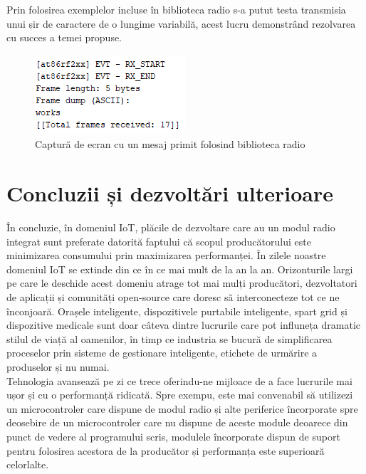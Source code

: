 \documentclass[12pt,a4paper]{report}
\begin{document}
Prin folosirea exemplelor incluse în biblioteca radio s-a putut testa transmisia unui șir de caractere de o lungime variabilă, acest lucru demonstrând rezolvarea cu succes a temei propuse.
\begin{figure}[!htb]
\centering
\includegraphics[scale=0.9]{pics/demoreceive.png}
  \caption{Captură de ecran cu un mesaj primit folosind biblioteca radio}
  \label{fig:demoreceive}
\end{figure}

\chapter{Concluzii și dezvoltări ulterioare}
În concluzie, în domeniul IoT, plăcile de dezvoltare care au un modul radio integrat sunt preferate datorită faptului că scopul producătorului este minimizarea consumului prin maximizarea performanței. În zilele noastre domeniul IoT se extinde din ce în ce mai mult de la an la an. Orizonturile largi pe care le deschide acest domeniu atrage tot mai mulți producători, dezvoltatori de aplicații și comunități open-source care doresc să interconecteze tot ce ne înconjoară. Orașele inteligente, dispozitivele purtabile inteligente, spart grid și dispozitive medicale sunt doar câteva dintre lucrurile care pot influneța dramatic stilul de viață al oamenilor, în timp ce industria se bucură de simplificarea proceselor prin sisteme de gestionare inteligente, etichete de urmărire a produselor și nu numai. \\
Tehnologia avansează pe zi ce trece oferindu-ne mijloace de a face lucrurile mai ușor și cu o performanță ridicată. Spre exempu, este mai convenabil să utilizezi un microcontroler care dispune de modul radio și alte periferice încorporate spre deosebire de un microcontroler care nu dispune de aceste module deoarece din punct de vedere al programului scris, modulele încorporate dispun de suport pentru folosirea acestora de la producător și performanța este superioară celorlalte.
\end{document}
